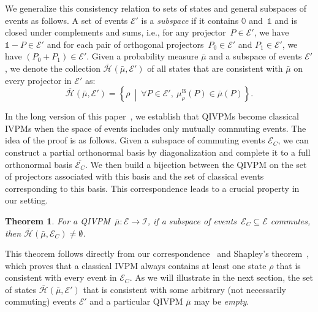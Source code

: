 \documentclass[english,reprint, aps, prl,superscriptaddress, showpacs,
showkeys, longbibliography, amsmath, amssymb]{revtex4-1}
\theoremstyle{plain}
\newtheorem{thm}{Theorem}
\theoremstyle{definition}
\newcommand{\Hilb}{\mathcal{H}}
\newcommand{\events}{\ensuremath{\mathcal{E}}}
\newcommand{\set}[2]{\ensuremath{\left\{ {#1}~\middle|~{#2}\right\} }}
\newcommand{\coreBorn}{\ensuremath{\overline{\Hilb}}}
\begin{document}
We generalize this consistency relation to sets of states and general
subspaces of events as follows. A set of events $\events'$ is a
\emph{subspace} if it contains $\mathbb{0}$ and~$\mathbb{1}$ and is
closed under complements and sums, i.e., for any
projector~$P\in\events'$, we have $\mathbb{1}-P\in\events'$ and for
each pair of orthogonal projectors~$P_0 \in \events'$ and
$P_1 \in \events'$, we have $(P_0 + P_1) \in \events'$. Given a
probability measure $\bar{\mu}$ and a subspace of events $\events'$,
we denote the collection $\coreBorn(\bar{\mu},\events')$ of all states
that are consistent with $\bar{\mu}$ on every projector in $\events'$
as:
\begin{equation}
\coreBorn\left(\bar{\mu},\events'\right)=\set{\rho}{\forall P\in \events',~\mu_{\rho}^{\mathrm{B}}\left(P\right)\in\bar{\mu}\left(P\right)}.
\end{equation}

In the long version of this paper~\cite{HOSTunpublished}, we establish that
QIVPMs become classical IVPMs when the space of events includes only mutually
commuting events. The idea of the proof is as follows. Given a
subspace of commuting events $\events_C$, we can construct a partial
orthonormal basis by diagonalization and complete it to a full
orthonormal basis $\overline{\events_C}$. We then build a bijection
between the QIVPM on the set of projectors associated with this basis
and the set of classical events corresponding to this basis. This
correspondence leads to a crucial property in our setting. 

\begin{thm}\label{thm:Shapley}
  For a QIVPM~$\bar{\mu}:\events\rightarrow\mathscr{I}$, if a subspace
  of events~$\events_C\subseteq\events$ commutes, then
  $\coreBorn\left(\bar{\mu},\events_C\right)\ne\emptyset$.
\end{thm}

This theorem follows directly from our
correspondence~\cite{HOSTunpublished} and Shapley's
theorem~\cite{Shapley1971,GilboaSchmeidler1994,Grabisch2016}, which
proves that a classical IVPM always contains at least one state $\rho$
that is consistent with every event in $\events_C$. As we will
illustrate in the next section, the set of states
$\coreBorn\left(\bar{\mu},\events'\right)$ that is consistent with
some arbitrary (not necessarily commuting) events $\events'$ and a
particular QIVPM $\bar{\mu}$ may be \emph{empty}.
\end{document}

